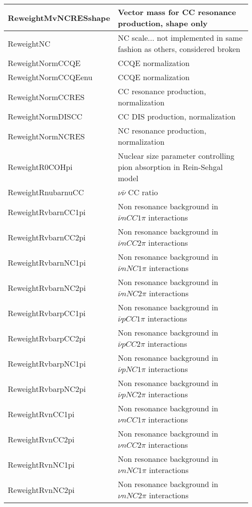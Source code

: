 \begin{longtable}{|p{}|p{}|}
 ReweightMvNCRESshape & Vector mass for CC resonance production, shape only \\ \hline
 ReweightNC & NC scale... not implemented in same fashion as others, considered broken \\ \hline
 ReweightNormCCQE & CCQE normalization \\ \hline
 ReweightNormCCQEenu & CCQE normalization \\ \hline
 ReweightNormCCRES & CC resonance production, normalization \\ \hline
 ReweightNormDISCC & CC DIS production, normalization  \\ \hline
 ReweightNormNCRES & NC resonance production, normalization  \\ \hline
 ReweightR0COHpi & Nuclear size parameter controlling pion absorption  in Rein-Sehgal model  \\ \hline
 ReweightRnubarnuCC & $\nu\bar{\nu} $ CC ratio\\ \hline
 ReweightRvbarnCC1pi & Non resonance background in $ \bar{\nu} n CC 1\pi$ interactions \\ \hline
 ReweightRvbarnCC2pi & Non resonance background in $ \bar{\nu} n CC 2\pi$ interactions \\ \hline
 ReweightRvbarnNC1pi & Non resonance background in $ \bar{\nu} n NC 1\pi$ interactions \\ \hline
 ReweightRvbarnNC2pi & Non resonance background in $ \bar{\nu} n NC 2\pi$ interactions \\ \hline
 ReweightRvbarpCC1pi & Non resonance background in $ \bar{\nu} p CC 1\pi$ interactions \\ \hline
 ReweightRvbarpCC2pi & Non resonance background in $ \bar{\nu} p CC2\pi$ interactions \\ \hline
 ReweightRvbarpNC1pi & Non resonance background in $ \bar{\nu} p NC1\pi$ interactions \\ \hline
 ReweightRvbarpNC2pi & Non resonance background in $ \bar{\nu} p NC2\pi$ interactions \\ \hline
 ReweightRvnCC1pi & Non resonance background in $\nu n CC1\pi$ interactions \\ \hline
 ReweightRvnCC2pi & Non resonance background in $\nu n CC2\pi$ interactions \\ \hline
 ReweightRvnNC1pi & Non resonance background in $\nu n NC1\pi$ interactions \\ \hline
 ReweightRvnNC2pi & Non resonance background in $\nu n NC2\pi$ interactions  \\ \hline

\end{longtable}
